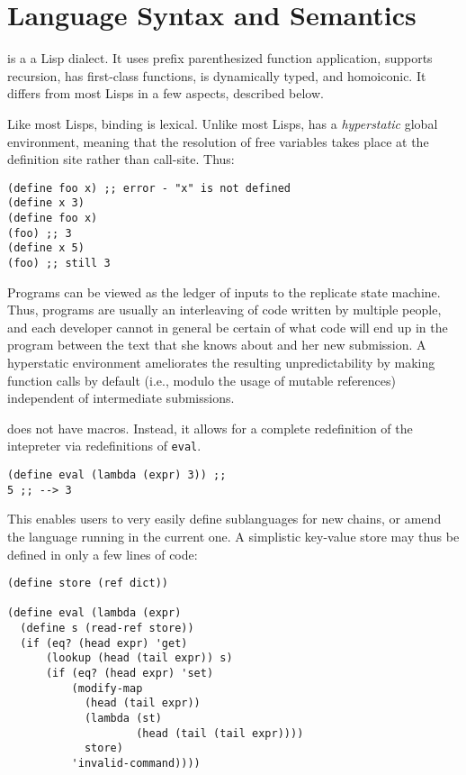 \section{Language Syntax and Semantics}
\label{s:language}

\rad is a a Lisp dialect. It uses prefix parenthesized function application,
supports recursion, has first-class functions, is dynamically typed, and
homoiconic. It differs from most Lisps in a few aspects, described below.

Like most Lisps, binding is lexical. Unlike most Lisps, \rad has a
\textit{hyperstatic} global environment, meaning that the resolution of free
variables takes place at the definition site rather than call-site. Thus:

\begin{verbatim}
(define foo x) ;; error - "x" is not defined
(define x 3)
(define foo x)
(foo) ;; 3
(define x 5)
(foo) ;; still 3
\end{verbatim}

Programs can be viewed as the ledger of inputs to the replicate state machine.
Thus, \rad programs are usually an interleaving of code written by multiple
people, and each developer cannot in general be certain of what code will end
up in the program between the text that she knows about and her new submission.
A hyperstatic environment ameliorates the resulting unpredictability by making
function calls by default (i.e., modulo the usage of mutable references)
independent of intermediate submissions.

\rad does not have macros. Instead, it allows for a complete redefinition of
the intepreter via redefinitions of \texttt{eval}.

\begin{verbatim}
(define eval (lambda (expr) 3)) ;;
5 ;; --> 3
\end{verbatim}

This enables users to very easily define sublanguages for new chains, or amend
the language running in the current one. A simplistic key-value store may thus
be defined in only a few lines of code:

\begin{lstlisting}
(define store (ref dict))

(define eval (lambda (expr)
  (define s (read-ref store))
  (if (eq? (head expr) 'get)
      (lookup (head (tail expr)) s)
      (if (eq? (head expr) 'set)
          (modify-map
            (head (tail expr))
            (lambda (st)
                    (head (tail (tail expr))))
            store)
          'invalid-command))))

\end{lstlisting}

